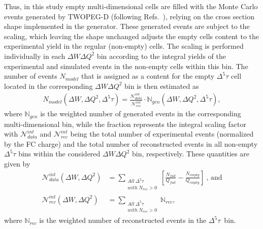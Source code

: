 Thus, in this study empty multi-dimensional cells are filled with the Monte Carlo events generated by TWOPEG-D (following Refs.~\cite{Rip_an_note:2002,Ripani:2002ss,Fed_an_note:2007,Fedotov:2008aa,Isupov:2017lnd,Arjun}), relying on the cross section shape implemented in the generator. These generated events are subject to the scaling, which leaving the shape unchanged adjusts the empty cells content to the experimental yield in the regular (non-empty) cells. The scaling is performed individually in each $\Delta W\Delta Q^2$ bin according to the integral yields of the experimental and simulated events in the non-empty cells within this bin. The number of events $N_{model}$ that is assigned as a content for the empty $\Delta^{5}\tau$ cell located in the corresponding $\Delta W\Delta Q^2$ bin is then estimated as
\begin{equation}
\begin{aligned}
N_{model}(\Delta W,\Delta Q^2,\Delta^{5}\tau) = \frac{\mathcal{N}_{data}^{int}}{\mathcal{N}_{rec}^{int}} \! \cdot \!\mathbb{N}_{gen}(\Delta W,\Delta Q^2,\Delta^{5}\tau),
\end{aligned}\label{n_model}
\end{equation}
where $\mathbb{N}_{gen}$ is the weighted number of generated events in the corresponding multi-dimensional bin, while the fraction represents the integral scaling factor with $\mathcal{N}_{data}^{int}$ and $\mathcal{N}_{rec}^{int}$ being the total number of experimental events (normalized by the FC charge) and the total number of reconstructed events in all non-empty $\Delta^{5}\tau$ bins within the considered $\Delta W\Delta Q^2$ bin, respectively. These quantities are given by
\begin{equation}
\begin{aligned}
\mathcal{N}_{data}^{int}(\Delta W,\Delta Q^2) &= \sum_{\substack{All~\Delta^{5}\tau\\ with~N_{rec}>0}} \!\!\! \left [\frac{N_{full}}{Q_{full}}-\frac{N_{empty}}{Q_{empty}} \right ]~\textrm{,~and}\\[8pt]
\mathcal{N}_{rec}^{int}(\Delta W,\Delta Q^2)  &= \sum_{\substack{All~\Delta^{5}\tau\\ with~N_{rec}>0}} \!\!\!\!\!\! \mathbb{N}_{rec},
\end{aligned}\label{ints}
\end{equation}
where  $\mathbb{N}_{rec}$ is the weighted number of reconstructed events in the $\Delta^{5}\tau$~bin. 


